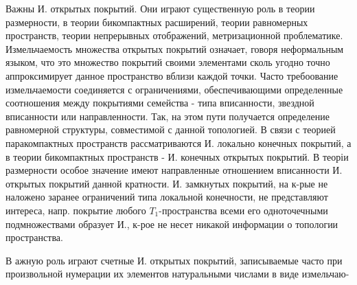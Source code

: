 \documentclass[10pt]{article}
\begin{document}
Важны И. открытых покрытий. Они играют существенную роль в теории размерности, в теории бикомпактных расширений, теории равномерных пространств, теории непрерывных отображений, метризационной проблематике. Измельчаемость множества открытых покрытий означает, говоря неформальным языком, что это множество покрытий своими элементами сколь угодно точно аппроксимирует данное пространство вблизи каждой точки. Часто требоование измельчаемости соединяется с ограничениями, обеспечивающими определенные соотношения между покрытиями семейства - типа вписанности, звездной вписанности или направленности. Так, на этом пути получается определение равномерной структуры, совместимой с данной топологией. В связи с теорией паракомпактных пространств рассматриваются И. локально конечных покрытий, а в теории бикомпактных пространств - И. конечных открытых покрытий. В теоріи размерности особое значение имеют направленные отношением вписанности И. открытых покрытий данной кратности. И. замкнутых покрытий, на к-рые не наложено заранее ограничений типа локальной конечности, не представляют интереса, напр. покрытие любого $T_{1}$-пространства всеми его одноточечными подмножествами образует И., к-рое не несет никакой информации о топологии пространства.



В ажную роль играют счетные И. открытых покрытий, записываемые часто при произвольной нумерации их элементов натуральными числами в виде измельчаю-
\end{document}
